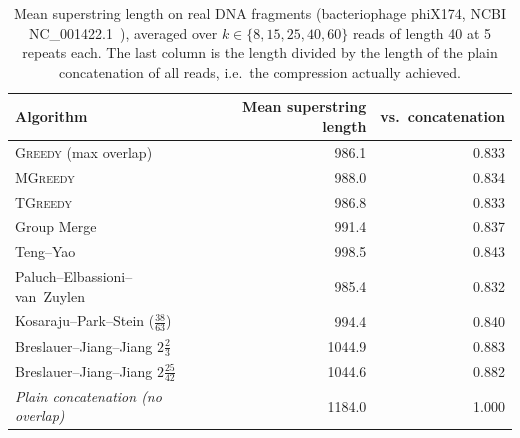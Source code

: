 \begin{table}[htbp]
    \centering
    \caption{Mean superstring length on real DNA fragments (bacteriophage phiX174, NCBI NC\_001422.1~\cite{ncbi_phix174}), averaged over $k \in \{8,15,25,40,60\}$ reads of length 40 at 5 repeats each. The last column is the length divided by the length of the plain concatenation of all reads, i.e.\ the compression actually achieved.}
    \label{tab:bench_dna}
    \small
    \setlength{\tabcolsep}{7pt}
    \renewcommand{\arraystretch}{1.1}
    \begin{tabular}{@{}lrr@{}}
        \toprule
        \textbf{Algorithm} & \textbf{Mean superstring length} & \textbf{vs.\ concatenation} \\
        \midrule
        \textsc{Greedy} (max overlap) & 986.1 & 0.833 \\
        \textsc{MGreedy} & 988.0 & 0.834 \\
        \textsc{TGreedy} & 986.8 & 0.833 \\
        Group Merge & 991.4 & 0.837 \\
        Teng--Yao & 998.5 & 0.843 \\
        Paluch--Elbassioni--van~Zuylen & 985.4 & 0.832 \\
        Kosaraju--Park--Stein ($\frac{38}{63}$) & 994.4 & 0.840 \\
        Breslauer--Jiang--Jiang $2\frac{2}{3}$ & 1044.9 & 0.883 \\
        Breslauer--Jiang--Jiang $2\frac{25}{42}$ & 1044.6 & 0.882 \\
        \addlinespace[2pt]
        \textit{Plain concatenation (no overlap)} & 1184.0 & 1.000 \\
        \bottomrule
    \end{tabular}
\end{table}
